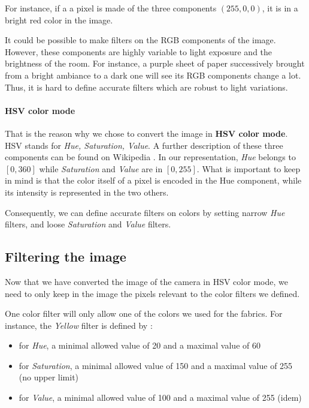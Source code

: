 \documentclass{article}
\begin{document}
For instance, if a a pixel is made of the three components $(255, 0, 0)$,
it is in a bright red color in the image.

It could be possible to make filters on the RGB components of the image.
However, these components are highly variable to light exposure and the brightness of the room.
For instance, a purple sheet of paper successively brought from a bright ambiance to a dark one
will see its RGB components change a lot.
Thus, it is hard to define accurate filters which are robust to light variations.

\paragraph{HSV color mode}
That is the reason why we chose to convert the image in \textbf{HSV color mode}.
HSV stands for \textit{Hue, Saturation, Value}.
A further description of these three components can be found on Wikipedia \cite{WikiHSV}.
In our representation, \textit{Hue} belongs to $[0, 360]$
while \textit{Saturation} and \textit{Value} are in $[0, 255]$.
What is important to keep in mind is that the color itself of a pixel is encoded in the Hue component,
while its intensity is represented in the two others.

Consequently, we can define accurate filters on colors by
setting narrow \textit{Hue} filters, and loose \textit{Saturation} and \textit{Value} filters.

        \subsection{Filtering the image}
Now that we have converted the image of the camera in HSV color mode,
we need to only keep in the image the pixels relevant to the color filters
we defined.

One color filter will only allow one of the colors we used for the fabrics.
For instance, the \textit{Yellow} filter is defined by :
\begin{itemize}
 \item for \textit{Hue}, a minimal allowed value of 20 and a maximal value of 60
 \item for \textit{Saturation}, a minimal allowed value of 150 and a maximal value of 255 (no upper limit)
 \item for \textit{Value}, a minimal allowed value of 100 and a maximal value of 255 (idem)
\end{itemize}
\end{document}
